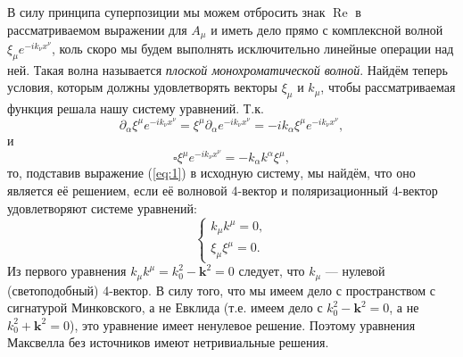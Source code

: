 \documentclass[a4paper,12pt]{article}
\begin{document}
 В силу принципа суперпозиции мы можем отбросить знак $\operatorname{Re}$ в
 рассматриваемом выражении для  $A_\mu$ и иметь дело прямо с комплексной волной
  $\xi_\mu e^{-i k_\nu x^\nu}$, коль скоро мы будем выполнять исключительно
  линейные операции над ней. Такая волна называется \emph{плоской монохроматической
  волной}. Найдём теперь условия, которым должны удовлетворять векторы
  $\xi_\mu$ и $k_\mu$, чтобы рассматриваемая функция решала нашу систему
  уравнений. Т.\:к.
  \[
  \partial_\alpha \xi^\mu e^{-i k_\nu x^\nu}=\xi^\mu \partial_\alpha
  e^{-i k_\nu x^\nu}=-i k_\alpha \xi^\mu e^{-i k_\nu x^\nu},
  \] 
  и
  \[
  \square \xi^\mu e^{-i k_\nu x^\nu}=-k_\alpha k^{\alpha} \xi^\mu
  ,\] 
  то, подставив выражение (\ref{eq:1}) в исходную систему, мы найдём, что
  оно является её решением, если её волновой 4-вектор и поляризационный
  4-вектор удовлетворяют системе уравнений:
  \[
  \left\{
	  \begin{aligned}
	  	k_\mu k^\mu=0,\\
		\xi_\mu \xi^\mu=0.
	  \end{aligned}
	  \right.
	  \tag{**}
	  \label{eq:2}
  \] 
  Из первого уравнения $k_\mu k^\mu=k_0^2-\mathbf{k}^2=0$ следует, что $k_\mu$
  --- нулевой (светоподобный) 4-вектор. В силу того, что мы имеем дело с
  пространством с сигнатурой Минковского, а не Евклида (т.\:е. имеем дело
  с $k_0^2-\mathbf{k}^2=0$, а не $k_0^2 +\mathbf{k}^2=0$), это уравнение
  имеет ненулевое решение. Поэтому уравнения Максвелла без источников
  имеют нетривиальные решения.
\end{document}

